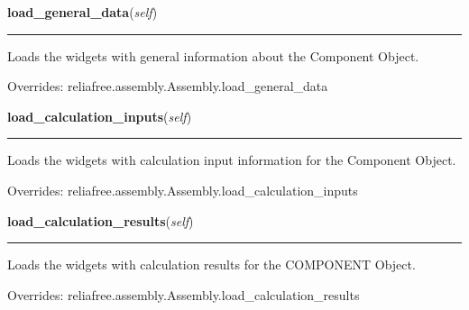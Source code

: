     \vspace{0.5ex}

\hspace{.8\funcindent}\begin{boxedminipage}{\funcwidth}

    \raggedright \textbf{load\_general\_data}(\textit{self})

    \vspace{-1.5ex}

    \rule{\textwidth}{0.5\fboxrule}
\setlength{\parskip}{2ex}
    Loads the widgets with general information about the Component Object.

\setlength{\parskip}{1ex}
      Overrides: reliafree.assembly.Assembly.load\_general\_data

    \end{boxedminipage}

    \vspace{0.5ex}

\hspace{.8\funcindent}\begin{boxedminipage}{\funcwidth}

    \raggedright \textbf{load\_calculation\_inputs}(\textit{self})

    \vspace{-1.5ex}

    \rule{\textwidth}{0.5\fboxrule}
\setlength{\parskip}{2ex}
    Loads the widgets with calculation input information for the Component 
    Object.

\setlength{\parskip}{1ex}
      Overrides: reliafree.assembly.Assembly.load\_calculation\_inputs

    \end{boxedminipage}

    \vspace{0.5ex}

\hspace{.8\funcindent}\begin{boxedminipage}{\funcwidth}

    \raggedright \textbf{load\_calculation\_results}(\textit{self})

    \vspace{-1.5ex}

    \rule{\textwidth}{0.5\fboxrule}
\setlength{\parskip}{2ex}
    Loads the widgets with calculation results for the COMPONENT Object.

\setlength{\parskip}{1ex}
      Overrides: reliafree.assembly.Assembly.load\_calculation\_results

    \end{boxedminipage}

